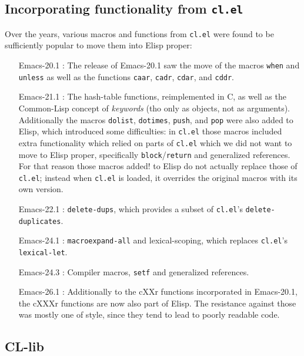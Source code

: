 \documentclass[format=acmsmall, review=false, screen=true]{acmart}
\newcommand \Elisp {Elisp}
\begin{document}
\subsection{Incorporating functionality from \texttt{cl.el}}

Over the years, various macros and functions from \texttt{cl.el} were found
to be sufficiently popular to move them into \Elisp{} proper:

\begin{itemize}
\item [Emacs-20.1]: The release of Emacs-20.1 saw the move of the macros
  \texttt{when} and \texttt{unless} as well as the functions \texttt{caar},
  \texttt{cadr}, \texttt{cdar}, and \texttt{cddr}.
\item [Emacs-21.1]: The hash-table functions, reimplemented in C, as well as
  the Common-Lisp concept of \emph{keywords} (tho only as objects, not as
  arguments).  Additionally the macros \texttt{dolist}, \texttt{dotimes},
  \texttt{push}, and \texttt{pop} were also added to \Elisp{}, which
  introduced some difficulties: in \texttt{cl.el} those macros included
  extra functionality which relied on parts of \texttt{cl.el} which we did
  not want to move to \Elisp{} proper, specifically
  \texttt{block}/\texttt{return} and generalized references.  For that
  reason those macros added! to \Elisp{} do not actually replace those of
  \texttt{cl.el}; instead when \texttt{cl.el} is loaded, it overrides the
  original macros with its own version.
\item [Emacs-22.1]: \texttt{delete-dups}, which provides a subset of
  \texttt{cl.el}'s \texttt{delete-duplicates}.
\item [Emacs-24.1]: \texttt{macroexpand-all} and lexical-scoping, which
  replaces \texttt{cl.el}'s \texttt{lexical-let}.
\item [Emacs-24.3]: Compiler macros, \texttt{setf} and
  generalized references.
\item [Emacs-26.1]: Additionally to the cXXr functions incorporated in
  Emacs-20.1, the cXXXr functions are now also part of \Elisp{}.
  The resistance against those was mostly one of style, since they tend to
  lead to poorly readable code.
\end{itemize}

\subsection{CL-lib}          %
\end{document}
